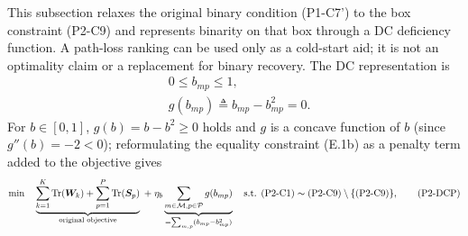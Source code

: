 This subsection relaxes the original binary condition (P1-C7') to the box constraint (P2-C9) and represents binarity on that box through a DC deficiency function. A path-loss ranking can be used only as a cold-start aid; it is not an optimality claim or a replacement for binary recovery. The DC representation is
\begin{subequations}\label{eq:b-rewrite}
\begin{align}
& 0 \leq b_{mp} \leq 1, \tag{E.1a} \\
& g(b_{mp}) \triangleq b_{mp} - b_{mp}^2 = 0. \tag{E.1b}
\end{align}
\end{subequations}
For $b \in [0,1]$, $g(b) = b - b^2 \geq 0$ holds and $g$ is a concave function of $b$ (since $g''(b) = -2 < 0$); reformulating the equality constraint (E.1b) as a penalty term added to the objective gives
\begin{equation}
\min \quad \underbrace{\sum_{k=1}^K \operatorname{Tr}(\bm{W}_k) + \sum_{p=1}^P \operatorname{Tr}(\bm{S}_p)}_{\text{original objective}} \; + \; \eta_b \underbrace{\sum_{m \in \mathcal{M}, p \in \mathcal{P}} g(b_{mp})}_{= \sum_{m,p} (b_{mp} - b_{mp}^2)} \quad \text{s.t. (P2-C1)} \sim \text{(P2-C9)} \setminus \{\text{(P2-C9)}\}, \tag{P2-DCP}
\end{equation}

